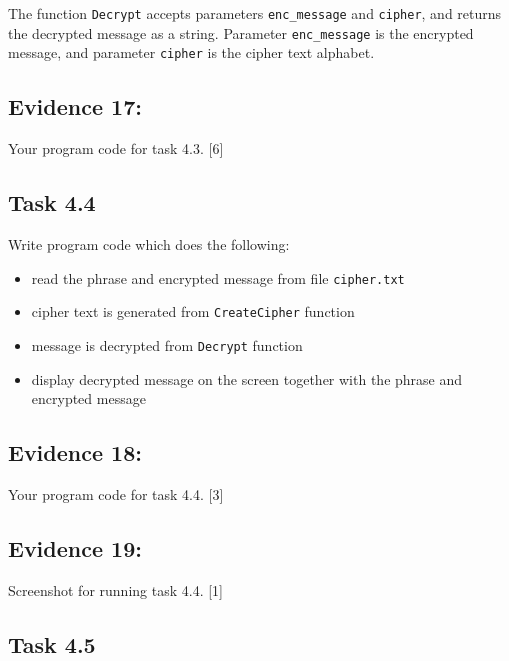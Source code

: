 The function \texttt{Decrypt} accepts parameters \texttt{enc\_message}
and \texttt{cipher}, and returns the decrypted message as a string.
Parameter \texttt{enc\_message} is the encrypted message, and parameter
\texttt{cipher} is the cipher text alphabet. 

\subsection*{Evidence 17: }

Your program code for task 4.3. \hfill{}{[}6{]}

\subsection*{Task 4.4 }

Write program code which does the following: 
\begin{itemize}
\item read the phrase and encrypted message from file \texttt{cipher.txt }
\item cipher text is generated from \texttt{CreateCipher} function 
\item message is decrypted from \texttt{Decrypt} function 
\item display decrypted message on the screen together with the phrase and
encrypted message 

\noindent{}
\end{itemize}

\subsection*{Evidence 18: }

Your program code for task 4.4.\hfill{} {[}3{]}

\subsection*{Evidence 19: }

Screenshot for running task 4.4. \hfill{}{[}1{]}

\subsection*{Task 4.5 }

